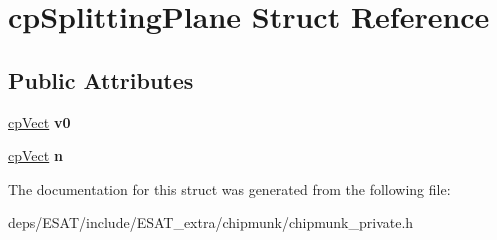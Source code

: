 \hypertarget{structcp_splitting_plane}{}\section{cp\+Splitting\+Plane Struct Reference}
\label{structcp_splitting_plane}
\subsection*{Public Attributes}
\begin{DoxyCompactItemize}
\item 
\mbox{\label{structcp_splitting_plane_a7bf5acca120e334f8b492f97dfc018e6}} 
\mbox{\hyperlink{structcp_vect}{cp\+Vect}} {\bfseries v0}
\item 
\mbox{\label{structcp_splitting_plane_a06037e7cd8fb72c093d468b699c9f666}} 
\mbox{\hyperlink{structcp_vect}{cp\+Vect}} {\bfseries n}
\end{DoxyCompactItemize}


The documentation for this struct was generated from the following file\+:\begin{DoxyCompactItemize}
\item 
deps/\+E\+S\+A\+T/include/\+E\+S\+A\+T\+\_\+extra/chipmunk/chipmunk\+\_\+private.\+h\end{DoxyCompactItemize}
